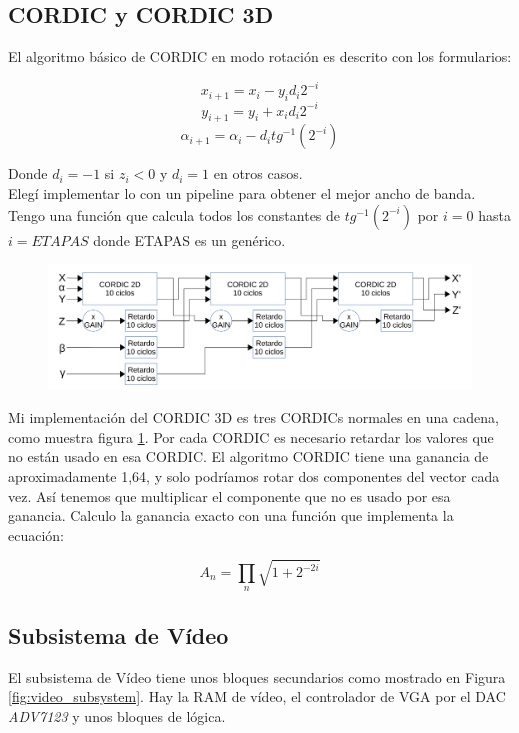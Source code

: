 \documentclass[a4paper]{article}
\begin{document}
\subsection {CORDIC y CORDIC 3D}

El algoritmo básico de CORDIC en modo rotación es descrito con los formularios:

\[ x_{i+1} = x_i - y_i d_i 2^{-i} \]
\[ y_{i+1} = y_i + x_i d_i 2^{-i} \]
\[ \alpha_{i+1} = \alpha_i - d_i tg^{-1}(2^{-i}) \]

Donde $ d_i = -1 $ si $ z_i < 0 $ y $ d_i = 1 $ en otros casos. \\

Elegí implementar lo con un pipeline para obtener el mejor ancho de banda. Tengo una función que calcula todos los constantes de $ tg^{-1}(2^{-i}) $ por $ i = 0 $ hasta $ i = ETAPAS $ donde ETAPAS es un genérico.

\begin{figure}[!h]
\includegraphics[width=15cm]{img/cordic3D_bloques.png}
\label{fig:cordic3d}
\end{figure}

Mi implementación del CORDIC 3D es tres CORDICs normales en una cadena, como muestra figura \ref{fig:cordic3d}. Por cada CORDIC es necesario retardar los valores que no están usado en esa CORDIC. El algoritmo CORDIC tiene una ganancia de aproximadamente 1,64, y solo podríamos rotar dos componentes del vector cada vez. Así tenemos que multiplicar el componente que no es usado por esa ganancia. Calculo la ganancia exacto con una función que implementa la ecuación:

\[ A_n = \prod_{n} \sqrt{1 + 2^{-2i}} \]

\subsection{Subsistema de Vídeo}

El subsistema de Vídeo tiene unos bloques secundarios como mostrado en Figura \ref{fig:video_subsystem}. Hay la RAM de vídeo, el controlador de VGA por el DAC \textit{ADV7123} y unos bloques de lógica.
\end{document}
